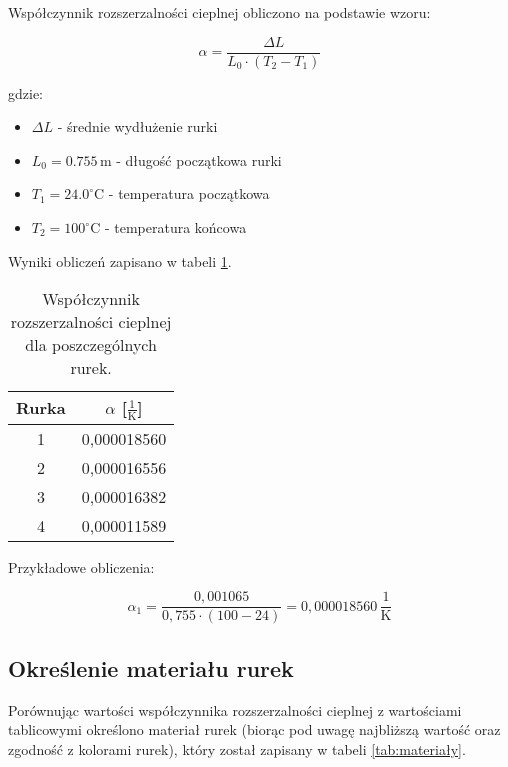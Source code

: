 \documentclass[a4paper,12pt]{article}
\begin{document}
Współczynnik rozszerzalności cieplnej obliczono na podstawie wzoru:

\begin{equation}
    \label{eq:wspolczynnik_rozszerzalnosci}
    \alpha = \frac{\Delta L}{L_0 \cdot (T_2 - T_1)}
\end{equation}

gdzie:
\begin{itemize}
    \item $\Delta L$ - średnie wydłużenie rurki
    \item $L_0 = 0.755\,\text{m}$ - długość początkowa rurki
    \item $T_1 = 24.0^\circ\text{C}$ - temperatura początkowa
    \item $T_2 = 100^\circ\text{C}$ - temperatura końcowa
\end{itemize}

Wyniki obliczeń zapisano w tabeli \ref{tab:wspolczynnik_rozszerzalnosci}.

\begin{table}[H]
    \centering
    \begin{tabular}{|c|c|}
        \hline
        Rurka & $\alpha$ [$\frac{1}{\text{K}}$] \\
        \hline
        1 & 0,000018560 \\
        \hline
        2 & 0,000016556 \\
        \hline
        3 & 0,000016382 \\
        \hline
        4 & 0,000011589 \\
        \hline
    \end{tabular}
    \caption{Współczynnik rozszerzalności cieplnej dla poszczególnych rurek.}
    \label{tab:wspolczynnik_rozszerzalnosci}
\end{table}

Przykładowe obliczenia:

\begin{equation}
    \alpha_1 = \frac{0{,}001065}{0{,}755 \cdot (100 - 24)} = 0{,}000018560\,\frac{1}{\text{K}}
\end{equation}

\subsection{Określenie materiału rurek}

Porównując wartości współczynnika rozszerzalności cieplnej z wartościami tablicowymi określono materiał rurek (biorąc pod uwagę najbliższą wartość oraz zgodność z kolorami rurek), który został zapisany w tabeli \ref{tab:materiały}.
\end{document}
